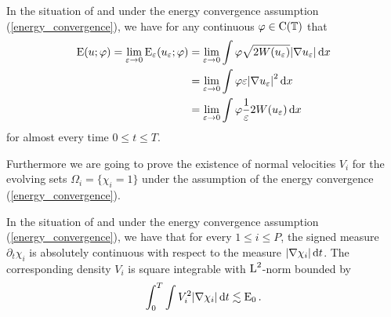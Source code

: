 \begin{lemma}
	\label{equipartition_of_energies_multiphase}
	In the situation of  and under 
	the energy convergence assumption (\ref{energy_convergence}), we have for 
	any continuous $ \varphi \in \operatorname{C} ( \operatorname{\mathbb{T}} ) $ that
	\begin{align*}
		\operatorname{E} ( u ; \varphi )
		=
		\lim_{ \varepsilon \to 0 }
		\operatorname{E}_{ \varepsilon } ( u_{ \varepsilon } ; \varphi )
		& =
		\lim_{ \varepsilon \to 0 }
		\int
		\varphi
		\sqrt{ 2 W ( u_{ \varepsilon } ) }
		\abs{ \nabla u_{ \varepsilon } }
		\dd{ x }
		\\
		& =
		\lim_{ \varepsilon \to 0 }
		\int
		\varphi
		\varepsilon
		\abs{ \nabla u_{ \varepsilon } }^{ 2 }
		\dd{ x }
		\\
		& =
		\lim_{ \varepsilon \to 0 }
		\int
		\varphi
		\frac{ 1 }{ \varepsilon } 2 W ( u_{ \varepsilon } )
		\dd{ x }
		\end{align*}
	for almost every time $ 0 \leq t \leq T $.
\end{lemma}
Furthermore we are going to prove the existence of normal velocities $ V_{ 
i } $ for the evolving sets $ \Omega_{ i } = \{ \chi_{ i } = 1 \} $ under the 
assumption of the energy 
convergence
(\ref{energy_convergence}).

\begin{proposition}
	\label{existence_and_square_integrability_of_velocities_multiphase}
	In the situation of  and under 
	the energy convergence assumption (\ref{energy_convergence}), we have that 
	for every $ 1 \leq i \leq P $, the signed measure $ \partial_{ t } \chi_{ i 
	} $ is absolutely continuous with respect to the measure $ \abs{ \nabla 
	\chi_{i } } \dd{ t } $. The corresponding density $ V_{ i } $ is square 
	integrable with $ \operatorname{L}^{ 2 } $-norm bounded by
	\begin{equation}
		\label{velocity_l2_estimate}
		\int_{ 0 }^{ T }
		\int
		V_{ i }^{ 2 }
		\abs{ \nabla \chi_{ i } }
		\dd{ t }
		\lesssim
		\operatorname{E}_{ 0 }.
	\end{equation}
\end{proposition}


